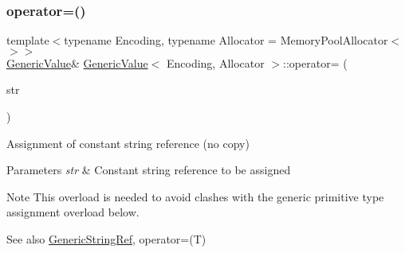 \subsubsection{\texorpdfstring{operator=()}{operator=()}\hspace{0.1cm}{\footnotesize\ttfamily [2/2]}}
{\footnotesize\ttfamily template$<$typename Encoding, typename Allocator = Memory\+Pool\+Allocator$<$$>$$>$ \\
\hyperlink{class_generic_value}{Generic\+Value}\& \hyperlink{class_generic_value}{Generic\+Value}$<$ Encoding, Allocator $>$\+::operator= (\begin{DoxyParamCaption}\item[{\hyperlink{class_generic_value_a32e0f30ee278072374c8168b14d3317f}{String\+Ref\+Type}}]{str }\end{DoxyParamCaption})\hspace{0.3cm}{\ttfamily [inline]}}



Assignment of constant string reference (no copy) 


\begin{DoxyParams}{Parameters}
{\em str} & Constant string reference to be assigned \\
\hline
\end{DoxyParams}
\begin{DoxyNote}{Note}
This overload is needed to avoid clashes with the generic primitive type assignment overload below. 
\end{DoxyNote}
\begin{DoxySeeAlso}{See also}
\hyperlink{struct_generic_string_ref}{Generic\+String\+Ref}, operator=(\+T) 
\end{DoxySeeAlso}
\mbox{\label{class_generic_value_a4a4418a93777942e1fb7ea71f8aaf680}} 
